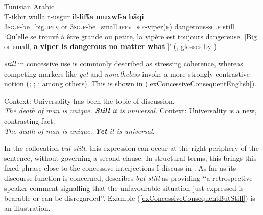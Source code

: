 \begin{exe}
	\ex Tunisian Arabic\label{exConcessiveConsequentBaqi}\\
	\gll T-ikbir wulla t-usġur \textbf{il}-\textbf{lifʕa} \textbf{muxwf}-\textbf{a} \textbf{bāqi}.\\
	3\textsc{sg}.\textsc{f}-be\_big.\textsc{ipfv} or 3\textsc{sg}.\textsc{f}-be\_small.\textsc{ipfv} \textsc{def}-viper(\textsc{f}) dangerous-\textsc{sg}.\textsc{f} still\\
	\glt \lq Qu’elle se trouvé à être grande ou petite, la vipère est toujours dangereuse. [Big or small, \textbf{a viper is dangerous no matter what}.]\rq{ }(\cite[366]{MarcaisGuiga19581961}, glosses by \cite{FischerEtAlTunisian})
\end{exe}\largerpage

 \textit{still} in concessive use is commonly described as stressing coherence, whereas competing markers like \textit{yet} and \textit{nonetheless} invoke a more strongly contrastive notion (\cite{Bell2010}; \cite{KoenigTraugott1982}; \cite[ch. 5]{Ranger2018}; among others). This is shown in (\ref{exConcessiveConsequentEnglish}).

\begin{exe}
	\ex \label{exConcessiveConsequentEnglish}
	\begin{xlist}
		\exi{}
		\ex Context: Universality has been the topic of discussion.\\
		\textit{The death of man is unique. \textbf{Still} it is universal.}
		\ex Context: Universality is a new, contrasting fact.\\
		 \textit{The death of man is unique. \textbf{Yet} it is universal.} \\\parencite[175]{KoenigTraugott1982}
	\end{xlist}
\end{exe}

In the collocation \textit{but still}, this expression can occur at the right periphery of the sentence, without governing a second clause. In structural terms, this brings this fixed phrase close to the concessive interjections I discuss in . As far as its discourse function is concerned, \textcite[130]{Lewis2019} describes \textit{but still} as providing \lq\lq a retrospective speaker comment signalling that the unfavourable situation just expressed is bearable or can be disregarded\rq\rq. Example (\ref{exConcessiveConsequentButStill}) is an illustration.

